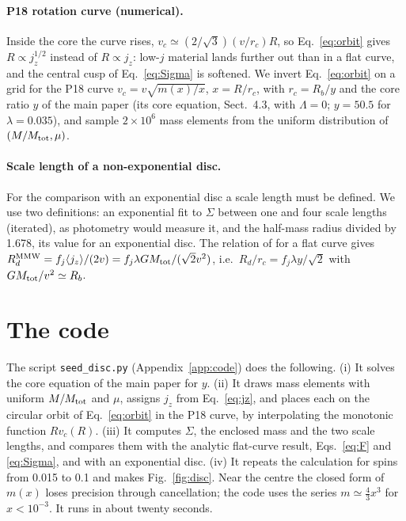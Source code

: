 \documentclass[11pt,a4paper]{article}
\newcommand{\rc}{r_c}
\newcommand{\Rb}{R_b}
\begin{document}
\paragraph{P18 rotation curve (numerical).} Inside the core the curve
rises, $v_c\simeq(2/\sqrt3)(v/\rc)R$, so Eq.~\eqref{eq:orbit} gives
$R\propto j_z^{1/2}$ instead of $R\propto j_z$: low-$j$ material lands
further out than in a flat curve, and the central cusp of
Eq.~\eqref{eq:Sigma} is softened. We invert Eq.~\eqref{eq:orbit} on a
grid for the P18 curve $v_c=v\sqrt{m(x)/x}$, $x=R/\rc$, with
$\rc=\Rb/y$ and the core ratio $y$ of the main paper (its core equation, Sect.~4.3, with
$\Lambda=0$; $y=50.5$ for $\lambda=0.035$), and sample $2\times10^6$ mass
elements from the uniform distribution of $(M/M_{\rm tot},\mu)$.

\paragraph{Scale length of a non-exponential disc.} For the comparison
with an exponential disc a scale length must be defined. We use two
definitions: an exponential fit to $\Sigma$ between one and four scale
lengths (iterated), as photometry would measure it, and the half-mass
radius divided by 1.678, its value for an exponential disc. The relation
of \citet{Mo1998} for a flat curve gives
$R_d^{\rm MMW}=f_j\langle j_z\rangle/(2v)=f_j\lambda GM_{\rm tot}/(\sqrt2v^2)$,
i.e.\ $R_d/\rc=f_j\lambda y/\sqrt2$ with $GM_{\rm tot}/v^2\simeq\Rb$.

\section{The code}

The script \texttt{seed\_disc.py} (Appendix~\ref{app:code}) does the
following. (i) It solves the core equation of the main paper for $y$.
(ii) It draws mass elements with uniform $M/M_{\rm tot}$ and $\mu$,
assigns $j_z$ from Eq.~\eqref{eq:jz}, and places each on the circular
orbit of Eq.~\eqref{eq:orbit} in the P18 curve, by interpolating the
monotonic function $Rv_c(R)$. (iii) It computes $\Sigma$, the enclosed
mass and the two scale lengths, and compares them with the analytic
flat-curve result, Eqs.~\eqref{eq:F} and \eqref{eq:Sigma}, and with an
exponential disc. (iv) It repeats the calculation for spins from 0.015
to 0.1 and makes Fig.~\ref{fig:disc}. Near the centre the closed form of
$m(x)$ loses precision through cancellation; the code uses the series
$m\simeq\tfrac43x^3$ for $x<10^{-3}$. It runs in about twenty seconds.
\end{document}
